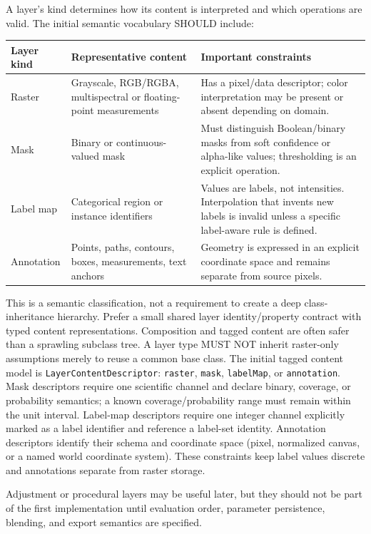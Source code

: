 \documentclass[11pt,a4paper,oneside]{article}
\begin{document}
A layer's kind determines how its content is interpreted and which operations are valid. The initial semantic vocabulary SHOULD include:
\begin{longtable}{@{}L{0.19\textwidth}L{0.27\textwidth}Z{0.43\textwidth}@{}}
\toprule
\textbf{Layer kind} & \textbf{Representative content} & \textbf{Important constraints} \\
\midrule
Raster & Grayscale, RGB/RGBA, multispectral or floating-point measurements & Has a pixel/data descriptor; color interpretation may be present or absent depending on domain. \\
Mask & Binary or continuous-valued mask & Must distinguish Boolean/binary masks from soft confidence or alpha-like values; thresholding is an explicit operation. \\
Label map & Categorical region or instance identifiers & Values are labels, not intensities. Interpolation that invents new labels is invalid unless a specific label-aware rule is defined. \\
Annotation & Points, paths, contours, boxes, measurements, text anchors & Geometry is expressed in an explicit coordinate space and remains separate from source pixels. \\
\bottomrule
\end{longtable}

This is a semantic classification, not a requirement to create a deep class-inheritance hierarchy. Prefer a small shared layer identity/property contract with typed content representations. Composition and tagged content are often safer than a sprawling subclass tree. A layer type MUST NOT inherit raster-only assumptions merely to reuse a common base class. The initial tagged content model is \texttt{LayerContentDescriptor}: \texttt{raster}, \texttt{mask}, \texttt{labelMap}, or \texttt{annotation}. Mask descriptors require one scientific channel and declare binary, coverage, or probability semantics; a known coverage/probability range must remain within the unit interval. Label-map descriptors require one integer channel explicitly marked as a label identifier and reference a label-set identity. Annotation descriptors identify their schema and coordinate space (pixel, normalized canvas, or a named world coordinate system). These constraints keep label values discrete and annotations separate from raster storage.

Adjustment or procedural layers may be useful later, but they should not be part of the first implementation until evaluation order, parameter persistence, blending, and export semantics are specified.
\end{document}
